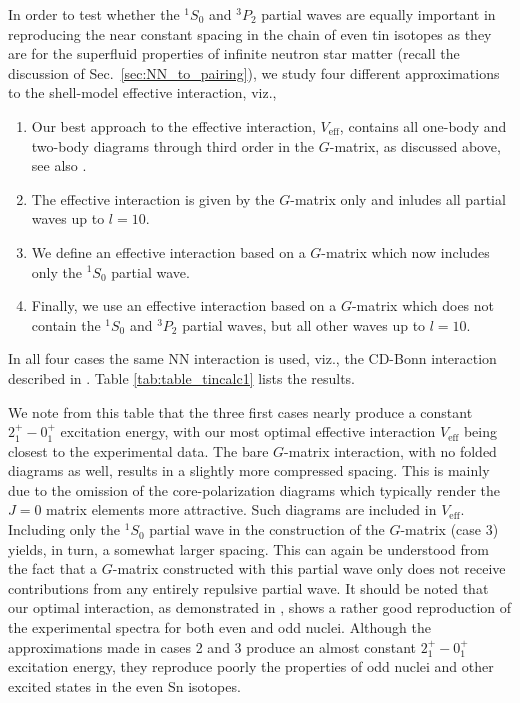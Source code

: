 \documentclass[rmp,aps,floatfix]{revtex4}
\begin{document}
In order to test whether the $^1S_0$ and $^3P_2$ partial waves are equally
important in reproducing the near constant spacing in the chain
of even tin isotopes as they are for the superfluid properties of infinite 
neutron star matter (recall the discussion of Sec.~\ref{sec:NN_to_pairing}),
we study four different approximations to the shell-model
effective interaction, viz.,
\begin{enumerate}
  \item Our best approach to the effective interaction, 
   $V_{\mathrm{eff}}$, contains all one-body and two-body diagrams through 
       third order in the $G$-matrix, as discussed above, 
        see also  \cite{anne98}. 
  \item The effective interaction is given by the $G$-matrix only and inludes
        all partial waves up to $l=10$.
  \item We define an effective  interaction based on a $G$-matrix which now includes
        only the $^1S_0$ partial wave.
  \item Finally, we use an effective interaction based on a $G$-matrix which does
        not contain the  $^1S_0$ and $^3P_2$ partial waves, but all other waves
        up to $l=10$.  
\end{enumerate}
In all four cases the same NN interaction is used, viz., 
the CD-Bonn interaction described in  \cite{bonn-cd}.
Table \ref{tab:table_tincalc1} lists the results.  

We note from this table that the three first cases nearly produce a constant 
$2^+_1-0^+_1$ excitation energy, with our most optimal effective interaction
$V_{\mathrm{eff}}$ being closest to the experimental data. The bare $G$-matrix
interaction, with no folded diagrams 
as well, results in a slightly more compressed
spacing. This is mainly due to the omission of the core-polarization 
diagrams which typically render the $J=0$ matrix elements more attractive.
Such diagrams are included in $V_{\mathrm{eff}}$. 
Including only the $^1S_0$ partial wave in the construction of the  $G$-matrix
(case 3)
yields, in turn, a somewhat larger 
spacing. This can again be understood from the
fact that a $G$-matrix constructed with this partial wave  
only does not receive contributions from any entirely repulsive partial wave.
It should be noted that our optimal interaction, as demonstrated in 
 \cite{anne98}, shows a rather good reproduction of the 
experimental spectra for both even and odd nuclei. Although the approximations
made in cases 2 and 3 produce an almost constant $2^+_1-0^+_1$ excitation energy,
they reproduce poorly the properties of odd nuclei and other 
excited states in the even Sn isotopes. 
\end{document}
